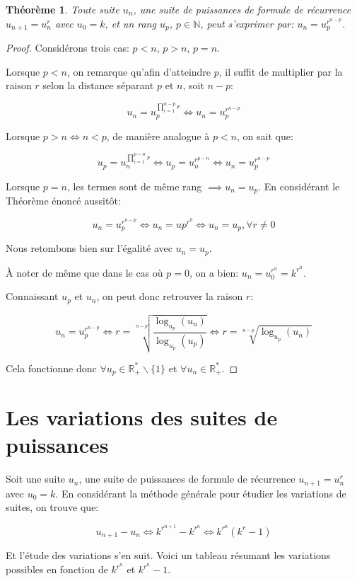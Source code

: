 \documentclass{amsart}
\newtheorem{theorem}{Théorème}[section]
\theoremstyle{definition}
\theoremstyle{remark}
\numberwithin{equation}{section}
\begin{document}
\begin{theorem}
    Toute suite $u_n$, une suite de puissances de formule de récurrence $u_{n+1}=u_n^r$ avec $u_0=k$, et un rang $u_p$, $p \in \mathbb{N}$, peut s'exprimer par: $u_n = u_p^{r^{n-p}}$.
\end{theorem}

\begin{proof}
    Considérons trois cas: $p<n$, $p>n$, $p=n$.

    Lorsque $p<n$, on remarque qu'afin d'atteindre $p$, il suffit de multiplier par la raison $r$ selon la distance séparant $p$ et $n$, soit $n-p$:
    
    \[u_n = u_p^{\prod_{i=1}^{n-p}r} \iff u_n = u_p^{r^{n-p}}\]
    
    Lorsque $p>n \iff n<p$, de manière analogue à $p<n$, on sait que:

    \[u_p = u_n^{\prod_{i=1}^{p-n}r} \iff u_p = u_n^{r^{p-n}} \iff u_n = u_p^{r^{n-p}}\]


    Lorsque $p=n$, les termes sont de même rang $\implies u_n=u_p$. En considérant le Théorème énoncé aussitôt:

    \[u_n = u_p^{r^{n-p}} \iff u_n=up^{r^0} \iff u_n=u_p, \forall r \ne 0\]

    Nous retombons bien sur l'égalité avec $u_n=u_p$.
    
    À noter de même que dans le cas où $p=0$, on a bien: $u_n=u_0^{r^n}=k^{r^n}$.

    Connaissant $u_p$ et $u_n$, on peut donc retrouver la raison $r$:

    \[u_n = u_p^{r^{n-p}} \iff r=\sqrt[n-p]{\frac{\log_{u_p}(u_n)}{\log_{u_p}(u_p)}} \iff r=\sqrt[n-p]{\log_{u_p}(u_n)}\]

    Cela fonctionne donc $\forall u_p \in \mathbb{R_{+}^*}\backslash\lbrace{1}\rbrace$ et $\forall u_n \in \mathbb{R_{+}^*}$.
\end{proof}

\section*{Les variations des suites de puissances}

Soit une suite $u_n$, une suite de puissances de formule de récurrence $u_{n+1}=u_n^r$ avec $u_0=k$.
En considérant la méthode générale pour étudier les variations de suites, on trouve que:

    \[u_{n+1}-u_n \iff k^{r^{n+1}}-k^{r^n} \iff k^{r^n}(k^r-1)\]

Et l'étude des variations s'en suit. Voici un tableau résumant les variations possibles en fonction de $k^{r^n}$ et $k^{r^n}-1$. \\
\end{document}
